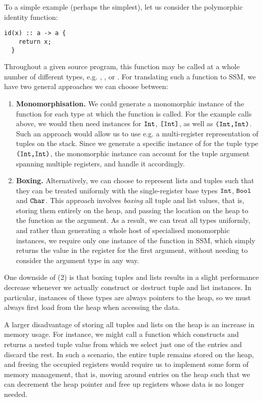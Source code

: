 To a simple example (perhaps the simplest), let us consider the polymorphic
identity function:
\begin{lstlisting}[language=spl]
  id(x) :: a -> a {
    return x;
  }
\end{lstlisting}
%
Throughout a given source program, this function may be called at a whole number
of different types, e.g. , , or . For
translating such a function to SSM, we have two general approaches we can choose
between:
\begin{enumerate}[label={(\arabic*)}]
  \item \textbf{Monomorphisation.} We could generate a monomorphic instance of
        the  function for each type at which the function is called. For
        the example calls above, we would then need instances for $\texttt{Int}$,
        $\texttt{[}\texttt{Int}\texttt{]}$, as well as $\texttt{(}\texttt{Int}\texttt{,}\texttt{Int}\texttt{)}$.
        Such an approach would allow us to use e.g. a multi-register
        representation of tuples on the stack. Since we generate a specific
        instance of  for the tuple type $\texttt{(}\texttt{Int}\texttt{,}\texttt{Int}\texttt{)}$, the
        monomorphic instance can account for the tuple argument spanning
        multiple registers, and handle it accordingly.
  \item \textbf{Boxing.} Alternatively, we can choose to represent lists and
        tuples such that they can be treated uniformly with the single-register
        base types $\texttt{Int}$, $\texttt{Bool}$ and $\texttt{Char}$.
        This approach involves \emph{boxing} all tuple and list values, that is,
        storing them entirely on the heap, and passing the location on the heap
        to the function as the argument.
        As a result, we can treat all types uniformly, and rather than
        generating a whole host of specialised monomorphic instances, we require
        only one instance of the  function in SSM, which simply returns
        the value in the register for the first argument, without needing to
        consider the argument type in any way.
\end{enumerate}

One downside of (2) is that boxing tuples and lists results in a slight
performance decrease whenever we actually construct or destruct tuple and list
instances. In particular, instances of these types are always pointers to the
heap, so we must always first load from the heap when accessing the data.

A larger disadvantage of storing all tuples and lists on the heap is an increase
in memory usage. For instance, we might call a function which constructs and
returns a nested tuple value from which we select just one of the entries and
discard the rest.
In such a scenario, the entire tuple remains stored on the heap, and freeing the
occupied registers would require us to implement some form of memory management,
that is, moving around entries on the heap such that we can decrement the heap
pointer and free up registers whose data is no longer needed.

